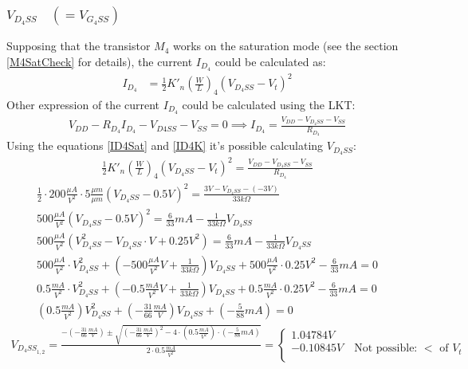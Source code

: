 \documentclass[10pt,a4paper]{book}
\begin{document}
\subsubsection{$V_{D_4SS}\quad (=V_{G_4SS})$}
Supposing that the transistor $M_4$ works on the saturation mode (see the section \ref{M4SatCheck} for details), the current $I_{D_4}$ could be calculated as:\\
\begin{align}
I_{D_4} &= \frac{1}{2}{K'}_n \left(\frac{W}{L}\right)_4 (V_{D_4SS} - V_t)^2 \label{ID4Sat}
\end{align}
Other expression of the current $I_{D_4}$ could be calculated using the LKT:\\
\begin{align}
V_{DD}-R_{D_4}I_{D_4}-V_{D4SS}-V_{SS} = 0 \implies
I_{D_4} = \frac{V_{DD} - V_{D_4SS} - V_{SS}}{R_{D_4}}\label{ID4K}
\end{align}
Using the equations \ref{ID4Sat} and \ref{ID4K} it's possible calculating $V_{D_4SS}$:\\
\begin{align}
\frac{1}{2}{K'}_n \left(\frac{W}{L}\right)_4 (V_{D_4SS} - V_t)^2 = \frac{V_{DD} - V_{D_4SS} - V_{SS}}{R_{D_4}}
\end{align}
\begin{align}
\frac{1}{2}\cdot 200 \frac{\mu A}{V^2} \cdot 5 \frac{\mu m}{\mu m} (V_{D_4SS} - 0.5V)^2 = \frac{3V - V_{D_4SS} - (-3V)}{33k\Omega}\\
500 \frac{\mu A}{V^2} (V_{D_4SS} -0.5V)^2 = \frac{6}{33}mA-\frac{1}{33k\Omega}V_{D_4SS}\\
500 \frac{\mu A}{V^2} (V_{D_4SS}^2- V_{D_4SS}\cdot V +0.25V^2) = \frac{6}{33}mA-\frac{1}{33k\Omega}V_{D_4SS}\\
500 \frac{\mu A}{V^2} \cdot V_{D_4SS}^2 + \left(-500 \frac{\mu A}{V^2}V + \frac{1}{33k\Omega}\right) V_{D_4SS} + 500 \frac{\mu A}{V^2} \cdot 0.25V^2 -\frac{6}{33}mA = 0\\
0.5 \frac{mA}{V^2} \cdot V_{D_4SS}^2 + \left(-0.5 \frac{mA}{V^2}V + \frac{1}{33k\Omega}\right) V_{D_4SS} + 0.5 \frac{mA}{V^2} \cdot 0.25V^2 -\frac{6}{33}mA = 0\\
\left(0.5 \frac{mA}{V^2}\right) V_{D_4SS}^2 + \left( -\frac{31}{66}\frac{mA}{V}\right) V_{D_4SS} + \left(-\frac{5}{88}mA\right) = 0
\end{align}
\begin{align}
V_{{D_{4}SS}_{1,2}} = \frac{-\left( -\frac{31}{66}\frac{mA}{V}\right)\pm \sqrt{\left(-\frac{31}{66}\frac{mA}{V}\right)^2-4\cdot\left(0.5 \frac{mA}{V^2}\right)\cdot\left(-\frac{5}{88}mA\right)}}{2\cdot0.5 \frac{mA}{V^2}} = 
\left\{
\begin{array}{l}
1.04784V \label{VD4SS}\\
-0.10845V \quad \text{Not possible: }<\text{ of } V_t\\
\end{array}
\right. 
\end{align}
\end{document}
